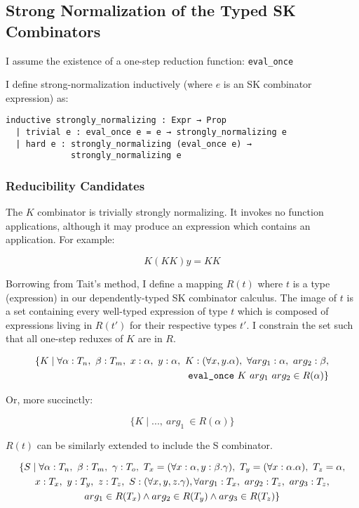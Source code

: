\documentclass[11pt]{article}
\begin{document}
\subsection{Strong Normalization of the Typed SK Combinators}
\label{sec:org9839d16}

I assume the existence of a one-step reduction function: \texttt{eval\_once}

I define strong-normalization inductively (where \(e\) is an SK combinator expression) as:

\begin{verbatim}
inductive strongly_normalizing : Expr → Prop
  | trivial e : eval_once e = e → strongly_normalizing e
  | hard e : strongly_normalizing (eval_once e) →
             strongly_normalizing e
\end{verbatim}
\subsubsection{Reducibility Candidates}
\label{sec:org339c25f}

The \(K\) combinator is trivially strongly normalizing. It invokes no function applications, although it may produce an expression which contains an application. For example:

\[
K (KK) y = KK
\]

Borrowing from Tait's method, I define a mapping \(R(t)\) where \(t\) is a type (expression) in our dependently-typed SK combinator calculus. The image of \(t\) is a set containing every well-typed expression of type \(t\) which is composed of expressions living in \(R(t')\) for their respective types \(t'\). I constrain the set such that all one-step reduxes of \(K\) are in \(R\).

\begin{align}
\{ K \mid \forall \alpha : T_{n},\ \beta : T_{m},\ x : \alpha,\ y : \alpha,\ K : (\forall x, y.\alpha),\ \forall arg_{1} : \alpha,\ arg_{2} : \beta, \notag \\
\text{\texttt{eval\_once}}\ K\  arg_{1}\  arg_{2} \in R(\alpha) \}
\end{align}

Or, more succinctly:

\[
\{ K \mid ...,\ arg_{1}\ \in R(\alpha) \}
\]

\(R(t)\) can be similarly extended to include the S combinator.

\begin{gather*}
\{ S \mid \forall \alpha : T_{n},\ \beta : T_{m},\ \gamma : T_{o},\ T_{x} = (\forall x : \alpha, y : \beta.\gamma),\ T_{y} = (\forall x : \alpha.\alpha),\ T_{z} = \alpha, \notag \\
  x : T_{x},\ y : T_{y},\ z : T_{z},\ S : (\forall x, y, z.\gamma), \forall arg_{1} : T_{x},\ arg_{2} : T_{z},\ arg_{3} : T_{z}, \notag \\
  arg_{1} \in R(T_{x}) \land arg_{2} \in R(T_{y}) \land arg_{3} \in R(T_{z}) \}
\end{gather*}
\end{document}
